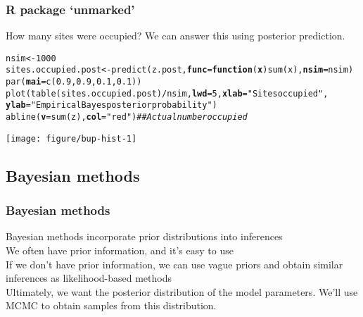 \documentclass[color=usenames,dvipsnames]{beamer}\usepackage[]{graphicx}\usepackage[]{color}
\makeatletter
\newcommand{\hlnum}[1]{\textcolor[rgb]{0.69,0.494,0}{#1}}%
\newcommand{\hlstr}[1]{\textcolor[rgb]{0.749,0.012,0.012}{#1}}%
\newcommand{\hlcom}[1]{\textcolor[rgb]{0.514,0.506,0.514}{\textit{#1}}}%
\newcommand{\hlopt}[1]{\textcolor[rgb]{0,0,0}{#1}}%
\newcommand{\hlstd}[1]{\textcolor[rgb]{0,0,0}{#1}}%
\newcommand{\hlkwa}[1]{\textcolor[rgb]{0,0,0}{\textbf{#1}}}%
\newcommand{\hlkwb}[1]{\textcolor[rgb]{0,0.341,0.682}{#1}}%
\newcommand{\hlkwc}[1]{\textcolor[rgb]{0,0,0}{\textbf{#1}}}%
\newcommand{\hlkwd}[1]{\textcolor[rgb]{0.004,0.004,0.506}{#1}}%
\newenvironment{kframe}{%
 \def\at@end@of@kframe{}%
 \ifinner\ifhmode%
  \def\at@end@of@kframe{\end{minipage}}%
  \begin{minipage}{\columnwidth}%
 \fi\fi%
 \def\FrameCommand##1{\hskip\@totalleftmargin \hskip-\fboxsep
 \colorbox{shadecolor}{##1}\hskip-\fboxsep
     \hskip-\linewidth \hskip-\@totalleftmargin \hskip\columnwidth}%
 \MakeFramed {\advance\hsize-\width
   \@totalleftmargin\z@ \linewidth\hsize
   \@setminipage}}%
 {\par\unskip\endMakeFramed%
 \at@end@of@kframe}
\newenvironment{knitrout}{}{} %
\makeatother
\begin{document}
\begin{frame}[fragile]
  \frametitle{R package `unmarked'}
  How many sites were occupied? \pause
  We can answer this using posterior prediction.
\begin{knitrout}\tiny
{}\color{fgcolor}\begin{kframe}
\begin{alltt}
\hlstd{nsim} \hlkwb{<-} \hlnum{1000}
\hlstd{sites.occupied.post} \hlkwb{<-} \hlkwd{predict}\hlstd{(z.post,} \hlkwc{func}\hlstd{=}\hlkwa{function}\hlstd{(}\hlkwc{x}\hlstd{)} \hlkwd{sum}\hlstd{(x),} \hlkwc{nsim}\hlstd{=nsim)}
\hlkwd{par}\hlstd{(}\hlkwc{mai}\hlstd{=}\hlkwd{c}\hlstd{(}\hlnum{0.9}\hlstd{,}\hlnum{0.9}\hlstd{,}\hlnum{0.1}\hlstd{,}\hlnum{0.1}\hlstd{))}
\hlkwd{plot}\hlstd{(}\hlkwd{table}\hlstd{(sites.occupied.post)}\hlopt{/}\hlstd{nsim,} \hlkwc{lwd}\hlstd{=}\hlnum{5}\hlstd{,} \hlkwc{xlab}\hlstd{=}\hlstr{"Sites occupied"}\hlstd{,}
    \hlkwc{ylab}\hlstd{=}\hlstr{"Empirical Bayes posterior probability"}\hlstd{)}
\hlkwd{abline}\hlstd{(}\hlkwc{v}\hlstd{=}\hlkwd{sum}\hlstd{(z),} \hlkwc{col}\hlstd{=}\hlstr{"red"}\hlstd{)} \hlcom{## Actual number occupied}
\end{alltt}
\end{kframe}

{\centering \texttt{[image: figure/bup-hist-1]} 

}



\end{knitrout}
\end{frame}



\subsection{Bayesian methods}


\begin{frame}
  \frametitle{Bayesian methods}
  Bayesian methods incorporate prior distributions into inferences \\
  \pause
  \vfill
  We often have prior information, and it's easy to use \\
  \pause
  \vfill
  If we don't have prior information, we can use vague priors and
  obtain similar inferences as likelihood-based methods \\
  \pause
  \vfill
  Ultimately, we want the posterior distribution of the model
  parameters. We'll use MCMC to obtain samples from this
  distribution. 
\end{frame}
\end{document}
